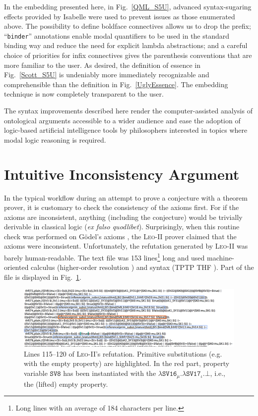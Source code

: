 \documentclass{article}
\begin{document}
In the embedding presented here, in Fig.~\ref{QML_S5U}, advanced
syntax-sugaring effects provided by Isabelle were used to prevent
issues as those enumerated above. The possibility to define boldface connectives allows us to drop the prefix; ``\texttt{binder}'' annotations enable modal quantifiers to be used in the standard binding way and reduce the need for explicit lambda abstractions; and a careful choice of priorities for infix connectives gives the parenthesis conventions that are more familiar to the user. As desired, the definition of essence in Fig.~\ref{Scott_S5U} is undeniably more immediately recognizable and comprehensible than the definition in Fig.~\ref{UglyEssence}. The embedding technique is now completely transparent to the user.

The syntax improvements described here render the computer-assisted analysis of ontological arguments accessible to a wider audience and ease the adoption of logic-based artificial intelligence tools by philosophers interested in topics where modal logic reasoning is required.


\section{Intuitive Inconsistency Argument} \label{sec:inconsistency}

In the typical workflow during an attempt to prove a conjecture with a theorem prover, it is customary to check the consistency of the axioms first. For if the axioms are inconsistent, anything (including the conjecture) would be trivially derivable in classical logic (\emph{ex falso quodlibet}). Surprisingly, when this routine check was performed on G\"odel's axioms \cite{C40}, the \textsc{Leo-II} prover claimed that the axioms were inconsistent. Unfortunately, the refutation generated by \textsc{Leo-II} was barely human-readable. The text file was 153 lines\footnote{Long lines with an average of 184 characters per line.} long and used machine-oriented calculus (higher-order resolution \cite{W47}) and syntax (TPTP THF \cite{J22}). Part of the file is displayed in Fig.~\ref{LEO-Proof}.

\begin{figure}
\centerline{\includegraphics[width=\textwidth]{./Images/LEO-Proof.png}}
\caption{Lines 115--120 of \textsc{Leo-II}'s refutation. Primitive
  substitutions (e.g. with the empty property) are highlighted. In the
red part, property variable $\texttt{SV8}$ has been instantiated with the
$\lambda \texttt{SV16}_{\mu}. \lambda \texttt{SV17}_{\iota}. \bot$, i.e., the (lifted) empty property.
} \label{LEO-Proof}
\end{figure}
\end{document}
